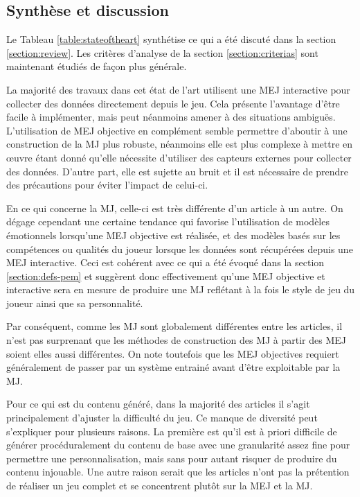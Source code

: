 \documentclass[a4paper,11pt]{article}
\begin{document}
      \subsection{Synthèse et discussion}

        Le Tableau \ref{table:stateoftheart} synthétise ce qui a été discuté dans la section \ref{section:review}.
        Les critères d'analyse de la section \ref{section:criterias} sont maintenant étudiés de façon plus générale.
        
        La majorité des travaux dans cet état de l'art utilisent une MEJ interactive pour collecter des données directement depuis le jeu.
        Cela présente l'avantage d'être facile à implémenter, mais peut néanmoins amener à des situations ambiguës.
        L'utilisation de MEJ objective en complément semble permettre d'aboutir à une construction de la MJ plus robuste, néanmoins elle est plus complexe à mettre en œuvre étant donné qu'elle nécessite d'utiliser des capteurs externes pour collecter des données.
        D'autre part, elle est sujette au bruit et il est nécessaire de prendre des précautions pour éviter l'impact de celui-ci.

        En ce qui concerne la MJ, celle-ci est très différente d'un article à un autre. 
        On dégage cependant une certaine tendance qui favorise l'utilisation de modèles émotionnels lorsqu'une MEJ objective est réalisée, et des modèles basés sur les compétences ou qualités du joueur lorsque les données sont récupérées depuis une MEJ interactive.
        Ceci est cohérent avec ce qui a été évoqué dans la section \ref{section:defs-pem} et suggèrent donc effectivement qu'une MEJ objective et interactive sera en mesure de produire une MJ reflétant à la fois le style de jeu du joueur ainsi que sa personnalité.
        
        Par conséquent, comme les MJ sont globalement différentes entre les articles, il n'est pas surprenant que les méthodes de construction des MJ à partir des MEJ soient elles aussi différentes.
        On note toutefois que les MEJ objectives requiert généralement de passer par un système entrainé avant d'être exploitable par la MJ.
      
        Pour ce qui est du contenu généré, dans la majorité des articles il s'agit principalement d'ajuster la difficulté du jeu.
        Ce manque de diversité peut s'expliquer pour plusieurs raisons.
        La première est qu'il est à priori difficile de générer procéduralement du contenu de base avec une granularité assez fine pour permettre une personnalisation, mais sans pour autant risquer de produire du contenu injouable.
        Une autre raison serait que les articles n'ont pas la prétention de réaliser un jeu complet et se concentrent plutôt sur la MEJ et la MJ.
      
\end{document}
